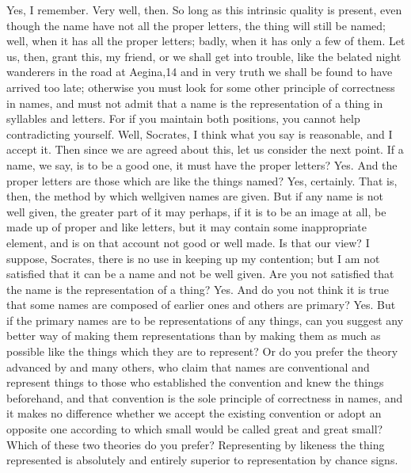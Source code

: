 {{{{{\cratylusspeaks
Yes, I remember.
\socratesspeaks
Very well, then. So long as this intrinsic quality is present, even though the name have not all the proper letters, the thing will still be named; well, when it has all the proper letters; badly, when it has only a few of them. Let us, then, grant this, my friend, or we shall get into trouble, like the belated night wanderers in the road at Aegina,14 and in very truth we shall be found to have arrived too late;  otherwise you must look for some other principle of correctness in names, and must not admit that a name is the representation of a thing in syllables and letters. For if you maintain both positions, you cannot help contradicting yourself.
\cratylusspeaks
Well, Socrates, I think what you say is reasonable, and I accept it.
\socratesspeaks
Then since we are agreed about this, let us consider the next point. If a name, we say, is to be a good one, it must have the proper letters?
\cratylusspeaks
Yes. 
\socratesspeaks
And the proper letters are those which are like the things named?
\cratylusspeaks
Yes, certainly.
\socratesspeaks
That is, then, the method by which wellgiven names are given. But if any name is not well given, the greater part of it may perhaps, if it is to be an image at all, be made up of proper and like letters, but it may contain some inappropriate element, and is on that account not good or well made. Is that our view?
\cratylusspeaks
I suppose, Socrates, there is no use in keeping up my contention; but I am not satisfied that it can be a name and not be well given.
\socratesspeaks
Are you not satisfied that the name is  the representation of a thing?
\cratylusspeaks
Yes.
\socratesspeaks
And do you not think it is true that some names are composed of earlier ones and others are primary?
\cratylusspeaks
Yes.
\socratesspeaks
But if the primary names are to be representations of any things, can you suggest any better way of making them representations than by making them as much as possible like the things which they are to represent?  Or do you prefer the theory advanced by \hermogenesspeaks and many others, who claim that names are conventional and represent things to those who established the convention and knew the things beforehand, and that convention is the sole principle of correctness in names, and it makes no difference whether we accept the existing convention or adopt an opposite one according to which small would be called great and great small? Which of these two theories do you prefer? 
\cratylusspeaks
Representing by likeness the thing represented is absolutely and entirely superior to representation by chance signs.
}}}}}
